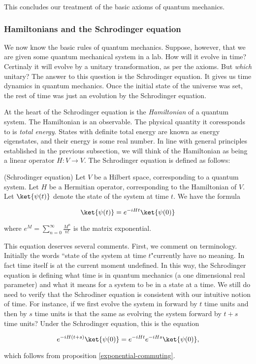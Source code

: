 This concludes our treatment of the basic axioms of quantum mechanics.

\subsubsection{Hamiltonians and the Schrodinger equation}

We now know the basic rules of quantum mechanics. Suppose, however, that we are given some quantum mechanical system in a lab. How will it evolve in time? Certinaly it will evolve by a unitary transformation, as per the axioms. But {\em which} unitary? The answer to this question is the Schrodinger equation. It gives us time dynamics in quantum mechanics. Once the initial state of the universe was set, the rest of time was just an evolution by the Schrodinger equation. 

At the heart of the Schrodinger equation is the {\em Hamiltonian} of a quantum system. The Hamiltonian is an observable. The physical quantity it coressponds to is {\em total energy}. States with definite total energy are known as energy eigenstates, and their energy is some real number. In line with general principles established in the previous subsection, we will think of the Hamiltonian as being a linear operator $H:V\to V$. The Schrodinger equation is defined as follows:

\begin{defn} (Schrodinger equation) Let $V$ be a Hilbert space, corresponding to a quantum system. Let $H$ be a Hermitian operator, corresponding to the Hamiltonian of $V$. Let $\ket{\psi(t)}$ denote the state of the system at time $t$. We have the formula

$$\ket{\psi(t)}=e^{-i H t}\ket{\psi(0)}$$

where $e^M=\sum_{n=0}^{\infty}\frac{M^n}{n!}$ is the matrix exponential.
\end{defn}

\begin{rem}
This equation deserves several comments. First, we comment on terminology. Initially the words ``state of the system at time $t$"currently have no meaning. In fact time itself is at the current moment undefined. In this way, the Schrodinger equation is defining what time is in quantum mechanics (a one dimensional real parameter) and what it means for a system to be in a state at a time. We still do need to verify that the Schrodiner equation is consistent with our intuitive notion of time. For instance, if we first evolve the system in forward by $t$ time units and then by $s$ time units is that the same as evolving the system forward by $t+s$ time units? Under the Schrodinger equation, this is the equation

$$e^{-i H (t+s)}\ket{\psi(0)}=e^{- i H t} e^{- i H s}\ket{\psi(0)},$$

which follows from proposition \ref{exponential-commuting}.
\end{rem}

